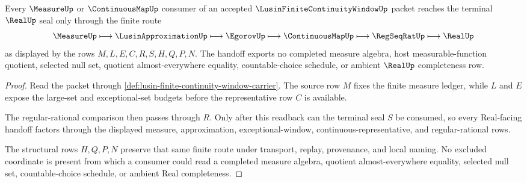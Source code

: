 \begin{theorem}\label{thm:lusin-finite-continuity-window-measure-handoff}
Every $\MeasureUp$ or $\ContinuousMapUp$ consumer of an accepted $\LusinFiniteContinuityWindowUp$ packet reaches the terminal $\RealUp$ seal only through the finite route
$$
\MeasureUp \longmapsto \LusinApproximationUp \longmapsto \EgorovUp \longmapsto \ContinuousMapUp \longmapsto \RegSeqRatUp \longmapsto \RealUp
$$
as displayed by the rows $M,L,E,C,R,S,H,Q,P,N$. The handoff exports no completed measure algebra, host measurable-function quotient, selected null set, quotient almost-everywhere equality, countable-choice schedule, or ambient $\RealUp$ completeness row.
\end{theorem}
\begin{proof}
Read the packet through \autoref{def:lusin-finite-continuity-window-carrier}. The source row $M$ fixes the finite measure ledger, while $L$ and $E$ expose the large-set and exceptional-set budgets before the representative row $C$ is available.

The regular-rational comparison then passes through $R$. Only after this readback can the terminal seal $S$ be consumed, so every Real-facing handoff factors through the displayed measure, approximation, exceptional-window, continuous-representative, and regular-rational rows.

The structural rows $H,Q,P,N$ preserve that same finite route under transport, replay, provenance, and local naming. No excluded coordinate is present from which a consumer could read a completed measure algebra, quotient almost-everywhere equality, selected null set, countable-choice schedule, or ambient Real completeness.
\end{proof}


